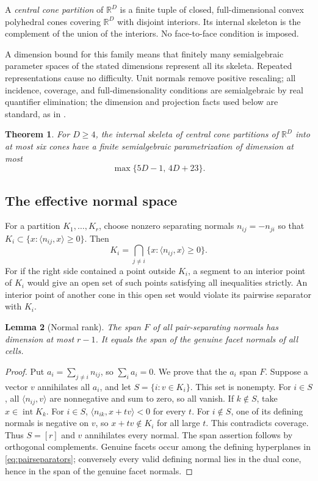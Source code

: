 \documentclass[a4paper,11pt,reqno]{amsart}
\newcommand{\R}{\mathbb R}
\newcommand{\intt}{\operatorname{int}}
\newtheorem{theorem}{Theorem}[section]
\newtheorem{lemma}[theorem]{Lemma}
\theoremstyle{definition}
\theoremstyle{remark}
\numberwithin{equation}{section}
\begin{document}
A \emph{central cone partition} of $\R^D$ is a finite tuple of closed,
full-dimensional convex polyhedral cones covering $\R^D$ with disjoint
interiors. Its internal skeleton is the complement of the union of
the interiors. No face-to-face condition is imposed.

A dimension bound for this family means that finitely many semialgebraic
parameter spaces of the stated dimensions represent all its skeleta.
Repeated representations cause no difficulty. Unit normals remove
positive rescaling; all incidence, coverage, and full-dimensionality
conditions are semialgebraic by real quantifier elimination; the dimension and projection facts used below are standard, as in \cite{BPR}.

\begin{theorem}\label{thm:conedim}
For $D\ge4$, the internal skeleta of central cone partitions of $\R^D$
into at most six cones have a finite semialgebraic parametrization of
dimension at most
\begin{equation}\label{eq:conebound}
                         \max\{5D-1,\,4D+23\}.
\end{equation}
\end{theorem}

\subsection{The effective normal space}
For a partition $K_1,\ldots,K_r$, choose nonzero separating normals
$n_{ij}=-n_{ji}$ so that $K_i\subset\{x:\langle n_{ij},x\rangle\ge0\}$.
Then
\begin{equation}\label{eq:pairseparators}
 K_i=\bigcap_{j\ne i}\{x:\langle n_{ij},x\rangle\ge0\}.
\end{equation}
For if the right side contained a point outside $K_i$, a segment to an
interior point of $K_i$ would give an open set of such points satisfying
all inequalities strictly. An interior point of another cone in this
open set would violate its pairwise separator with $K_i$.

\begin{lemma}[Normal rank]\label{lem:rank}
The span $F$ of all pair-separating normals has dimension at most $r-1$.
It equals the span of the genuine facet normals of all cells.
\end{lemma}
\begin{proof}
Put $a_i=\sum_{j\ne i}n_{ij}$, so $\sum_i a_i=0$. We prove that the
$a_i$ span $F$. Suppose a vector $v$ annihilates all $a_i$, and let
$S=\{i:v\in K_i\}$. This set is nonempty. For $i\in S$, all
$\langle n_{ij},v\rangle$ are nonnegative and sum to zero, so all vanish.
If $k\notin S$, take $x\in\intt K_k$. For $i\in S$,
$\langle n_{ik},x+tv\rangle<0$ for every $t$. For $i\notin S$, one
of its defining normals is negative on $v$, so $x+tv\notin K_i$ for
all large $t$. This contradicts coverage. Thus $S=[r]$ and $v$
annihilates every normal. The span assertion follows by orthogonal
complements. Genuine facets occur among the defining hyperplanes in
\eqref{eq:pairseparators}; conversely every valid defining normal lies
in the dual cone, hence in the span of the genuine facet normals.
\end{proof}
\end{document}
